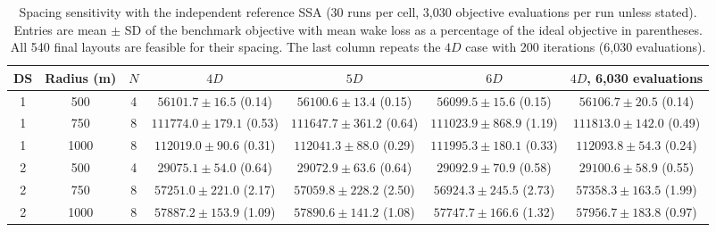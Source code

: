 \begin{table}[!t]
\centering
\caption{Spacing sensitivity with the independent reference SSA (30 runs per cell, 3,030 objective evaluations per run unless stated). Entries are mean $\pm$ SD of the benchmark objective with mean wake loss as a percentage of the ideal objective in parentheses. All 540 final layouts are feasible for their spacing. The last column repeats the $4D$ case with 200 iterations (6,030 evaluations).}
\label{tab:spacing-reopt}
\footnotesize\setlength{\tabcolsep}{4pt}
\begin{tabular}{ccccccc}
\toprule
DS & Radius (m) & $N$ & $4D$ & $5D$ & $6D$ & $4D$, 6,030 evaluations \\
\midrule
1 & 500 & 4 & $56101.7\pm16.5$ (0.14) & $56100.6\pm13.4$ (0.15) & $56099.5\pm15.6$ (0.15) & $56106.7\pm20.5$ (0.14) \\
1 & 750 & 8 & $111774.0\pm179.1$ (0.53) & $111647.7\pm361.2$ (0.64) & $111023.9\pm868.9$ (1.19) & $111813.0\pm142.0$ (0.49) \\
1 & 1000 & 8 & $112019.0\pm90.6$ (0.31) & $112041.3\pm88.0$ (0.29) & $111995.3\pm180.1$ (0.33) & $112093.8\pm54.3$ (0.24) \\
2 & 500 & 4 & $29075.1\pm54.0$ (0.64) & $29072.9\pm63.6$ (0.64) & $29092.9\pm70.9$ (0.58) & $29100.6\pm58.9$ (0.55) \\
2 & 750 & 8 & $57251.0\pm221.0$ (2.17) & $57059.8\pm228.2$ (2.50) & $56924.3\pm245.5$ (2.73) & $57358.3\pm163.5$ (1.99) \\
2 & 1000 & 8 & $57887.2\pm153.9$ (1.09) & $57890.6\pm141.2$ (1.08) & $57747.7\pm166.6$ (1.32) & $57956.7\pm183.8$ (0.97) \\
\bottomrule
\end{tabular}
\end{table}
